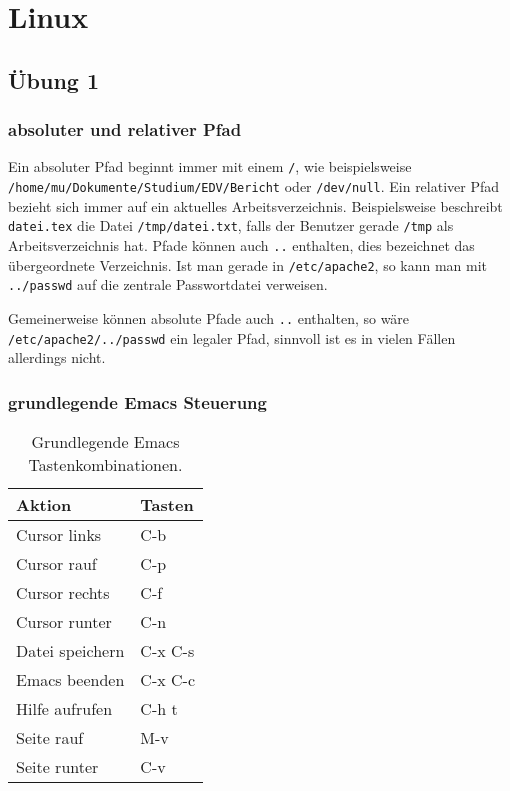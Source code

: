 
\part{Linux}

\chapter{Übung 1}



\section{absoluter und relativer Pfad}

Ein absoluter Pfad beginnt immer mit einem \texttt{/}, wie beispielsweise \\ \texttt{/home/mu/Dokumente/Studium/EDV/Bericht} oder \texttt{/dev/null}. Ein relativer Pfad bezieht sich immer auf ein aktuelles Arbeitsverzeichnis. Beispielsweise beschreibt \texttt{datei.tex} die Datei \texttt{/tmp/datei.txt}, falls der Benutzer gerade \texttt{/tmp} als Arbeitsverzeichnis hat. Pfade können auch \texttt{..} enthalten, dies bezeichnet das übergeordnete Verzeichnis. Ist man gerade in \texttt{/etc/apache2}, so kann man mit \texttt{../passwd} auf die zentrale Passwortdatei verweisen.

Gemeinerweise können absolute Pfade auch \texttt{..} enthalten, so wäre \\
\texttt{/etc/apache2/../passwd} ein legaler Pfad, sinnvoll ist es in vielen Fällen allerdings nicht.

\section{grundlegende Emacs Steuerung}

\begin{table}[htb]
\begin{center}
\begin{tabular}{ll}
Aktion & Tasten \\
\hline
Cursor links & C-b \\
Cursor rauf & C-p \\
Cursor rechts & C-f \\
Cursor runter & C-n \\
Datei speichern & C-x C-s \\
Emacs beenden & C-x C-c \\
Hilfe aufrufen & C-h t \\
Seite rauf & M-v \\
Seite runter & C-v \\
\end{tabular}
\end{center}
\caption{Grundlegende Emacs Tastenkombinationen.}
\end{table}

